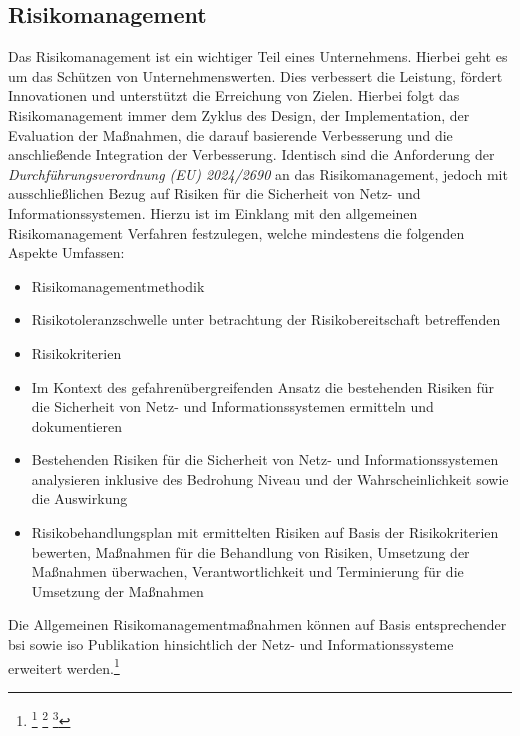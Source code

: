 \documentclass[11pt,a4paper,hidelinks]{article}   %
\begin{document}
        \subsection{Risikomanagement}
        Das Risikomanagement ist ein wichtiger Teil eines Unternehmens. Hierbei geht es um das Schützen von Unternehmenswerten. Dies verbessert die Leistung, fördert Innovationen und unterstützt die Erreichung von Zielen. Hierbei folgt das Risikomanagement immer dem Zyklus des Design, der Implementation, der Evaluation der Maßnahmen, die darauf basierende Verbesserung und die anschließende Integration der Verbesserung. Identisch sind die Anforderung der \emph{Durchführungsverordnung (EU) 2024/2690} an das Risikomanagement, jedoch mit ausschließlichen Bezug auf Risiken für die Sicherheit von Netz- und Informationssystemen. Hierzu ist im Einklang mit den allgemeinen Risikomanagement Verfahren festzulegen, welche mindestens die folgenden Aspekte Umfassen:
        \begin{itemize}
            \item Risikomanagementmethodik
            \item Risikotoleranzschwelle unter betrachtung der Risikobereitschaft betreffenden 
            \item Risikokriterien
            \item Im Kontext des gefahrenübergreifenden Ansatz die bestehenden Risiken für die Sicherheit von Netz- und Informationssystemen ermitteln und dokumentieren
            \item Bestehenden Risiken für die Sicherheit von Netz- und Informationssystemen analysieren inklusive des Bedrohung Niveau und der Wahrscheinlichkeit sowie die Auswirkung 
            \item Risikobehandlungsplan mit ermittelten Risiken auf Basis der Risikokriterien bewerten, Maßnahmen für die Behandlung von Risiken, Umsetzung der Maßnahmen überwachen, Verantwortlichkeit und Terminierung für die Umsetzung der Maßnahmen 
        \end{itemize}
        Die Allgemeinen Risikomanagementmaßnahmen können auf Basis entsprechender \gls{bsi} sowie \gls{iso} Publikation hinsichtlich der Netz- und Informationssysteme erweitert werden.\footnote{
            \footcite[Vgl.][, S. V, 2 - 4]{iso31000-2018}
            \footcite[Vgl.][, S. 7, 9 - 10]{bsi-200-3}
            \footcite[Vgl.][, §12]{KRITIS-DachG}
        }
        
\end{document}
